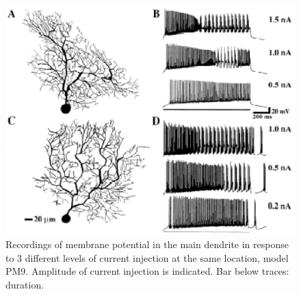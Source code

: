 \documentclass[12pt]{article}
\begin{document}
\clearpage

\begin{figure}[h]
\centering
   \includegraphics[scale=0.75]{figures/Fig.1.8.eps}
   \caption{Recordings of membrane potential in the main dendrite in response
to 3 different levels of current injection at the same location, model
PM9. Amplitude of current injection is indicated. Bar below traces: duration.}
   \label{fig:DS1.8}
\end{figure}

\clearpage
\end{document}

